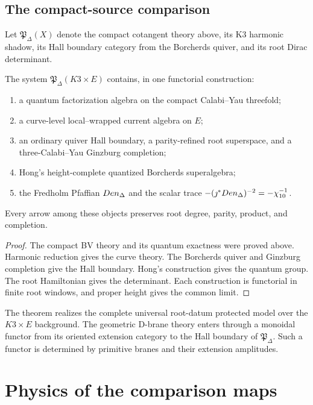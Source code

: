\chapter{The compact-source comparison}
Let $\mathfrak P_\Delta(X)$ denote the compact cotangent theory above, its K3 harmonic shadow, its Hall boundary category from the Borcherds quiver, and its root Dirac determinant.

\begin{theorem}
The system $\mathfrak P_\Delta(K3\times E)$ contains, in one functorial construction:
\begin{enumerate}
\item a quantum factorization algebra on the compact Calabi--Yau threefold;
\item a curve-level local--wrapped current algebra on $E$;
\item an ordinary quiver Hall boundary, a parity-refined root superspace, and a three-Calabi--Yau Ginzburg completion;
\item Hong's height-complete quantized Borcherds superalgebra;
\item the Fredholm Pfaffian $Den_{\Delta}$ and the scalar trace $-(\jmath^*Den_{\Delta})^{-2}=-\chi_{10}^{-1}$.
\end{enumerate}
Every arrow among these objects preserves root degree, parity, product, and completion.
\end{theorem}
\begin{proof}
The compact BV theory and its quantum exactness were proved above.  Harmonic reduction gives the curve theory.  The Borcherds quiver and Ginzburg completion give the Hall boundary.  Hong's construction gives the quantum group.  The root Hamiltonian gives the determinant.  Each construction is functorial in finite root windows, and proper height gives the common limit.
\end{proof}

The theorem realizes the complete universal root-datum protected model over the $K3\times E$ background.  The geometric D-brane theory enters through a monoidal functor from its oriented extension category to the Hall boundary of $\mathfrak P_\Delta$.  Such a functor is determined by primitive branes and their extension amplitudes.


\part[Physics]{Physics of the comparison maps}


